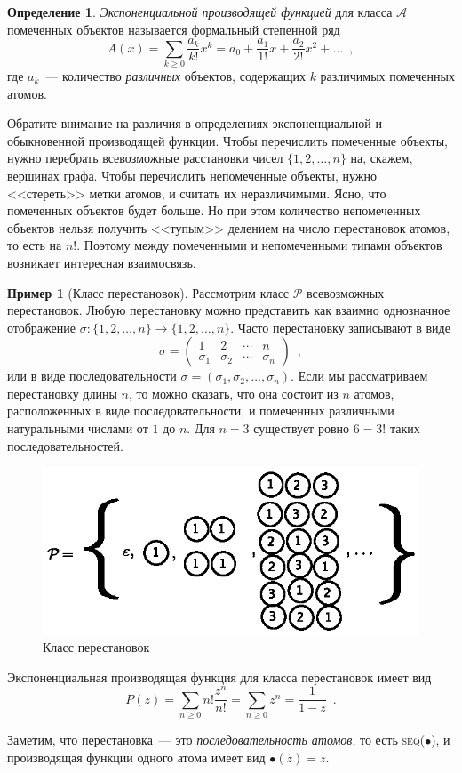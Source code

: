 \documentclass{article}
\theoremstyle{definition}
\newtheorem{example}{Пример}
\newtheorem*{definition}{Определение}
\begin{document}
\begin{definition}
\textit{Экспоненциальной производящей функцией} для класса \( \mathcal A \) 
помеченных объектов
называется формальный 
степенной ряд
\[
	A(x) = \sum_{k \geq 0} \dfrac{a_k}{k!}x^k = a_0 + \dfrac{a_1}{1!} x + 
	\dfrac{a_2}{2!}x^2 + \ldots
	\enspace ,
\]
где \( a_k \)~--- количество \textit{различных} объектов, содержащих \( k \) 
различимых 
помеченных атомов.
\end{definition}

Обратите внимание на различия в определениях экспоненциальной и обыкновенной 
производящей функции. Чтобы перечислить помеченные объекты, нужно перебрать 
всевозможные расстановки чисел \( \{ 1, 2, \ldots, n \} \) на, скажем, вершинах 
графа. Чтобы перечислить непомеченные объекты, нужно <<стереть>> метки атомов, 
и считать их неразличимыми. Ясно, что помеченных объектов будет больше. Но при 
этом количество непомеченных объектов нельзя получить <<тупым>> делением на 
число перестановок атомов, то есть на \( n! \). Поэтому между помеченными и 
непомеченными типами объектов возникает интересная взаимосвязь.

\begin{example}[Класс перестановок]
Рассмотрим класс \( \mathcal P \) всевозможных перестановок. Любую перестановку 
можно представить как взаимно однозначное отображение \( \sigma \colon \{ 1, 2, 
\ldots, n \} \to \{ 1, 2, \ldots, n \} \). Часто перестановку записывают в виде
\[
	\sigma = \begin{pmatrix}
		1 & 2 & \cdots & n \\
		\sigma_1 & \sigma_2 & \cdots & \sigma_n
	\end{pmatrix} \enspace ,
\]
или в виде последовательности \( \sigma = (\sigma_1, \sigma_2, \ldots, 
\sigma_n) \). Если мы рассматриваем перестановку длины \( n \), то можно 
сказать, что она состоит из \( n \) атомов, расположенных в виде 
последовательности, и помеченных различными натуральными 
числами от \( 1 \) до \( n \). Для \( n = 3 \) существует ровно \( 6 = 3! \) 
таких последовательностей.

\begin{figure}[h]
\centering
	\includegraphics[width=.5\textwidth]{permutation.eps}
	\caption{Класс перестановок}
	\label{fig:permutation}	
\end{figure}

Экспоненциальная производящая функция для класса перестановок имеет вид
\[
	P(z) = \sum_{n \geq 0} n! \dfrac{z^n}{n!} = \sum_{n \geq 0}z^n = 
	\dfrac{1}{1 - z} \enspace .
\]

Заметим, что перестановка~--- это \textit{последовательность атомов}, то есть 
\textsc{seq}(\( \bullet \)), и производящая функции одного атома имеет вид \( 
\bullet(z) = z \).
\end{example}
\end{document}

